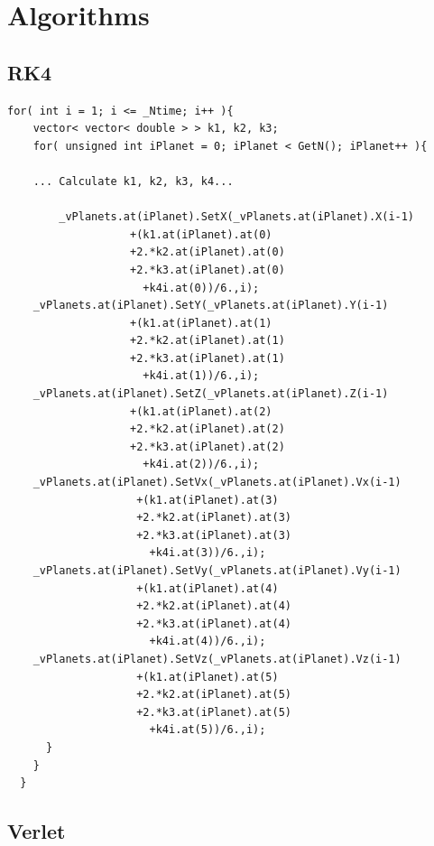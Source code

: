 \documentclass[a4paper,12pt]{report}
\begin{document}
\section{Algorithms}\label{sec:alg}

\subsection{RK4}

\singlespacing
\begin{Verbatim}[fontsize=\small]
   for( int i = 1; i <= _Ntime; i++ ){
    vector< vector< double > > k1, k2, k3; 
    for( unsigned int iPlanet = 0; iPlanet < GetN(); iPlanet++ ){
    
    ... Calculate k1, k2, k3, k4...
    
    	_vPlanets.at(iPlanet).SetX(_vPlanets.at(iPlanet).X(i-1)
				   +(k1.at(iPlanet).at(0)
				   +2.*k2.at(iPlanet).at(0)
				   +2.*k3.at(iPlanet).at(0)
				     +k4i.at(0))/6.,i);
	_vPlanets.at(iPlanet).SetY(_vPlanets.at(iPlanet).Y(i-1)
				   +(k1.at(iPlanet).at(1)
				   +2.*k2.at(iPlanet).at(1)
				   +2.*k3.at(iPlanet).at(1)
				     +k4i.at(1))/6.,i);
	_vPlanets.at(iPlanet).SetZ(_vPlanets.at(iPlanet).Z(i-1)
				   +(k1.at(iPlanet).at(2)
				   +2.*k2.at(iPlanet).at(2)
				   +2.*k3.at(iPlanet).at(2)
				     +k4i.at(2))/6.,i);
	_vPlanets.at(iPlanet).SetVx(_vPlanets.at(iPlanet).Vx(i-1)
				    +(k1.at(iPlanet).at(3)
				    +2.*k2.at(iPlanet).at(3)
				    +2.*k3.at(iPlanet).at(3)
				      +k4i.at(3))/6.,i);
	_vPlanets.at(iPlanet).SetVy(_vPlanets.at(iPlanet).Vy(i-1)
				    +(k1.at(iPlanet).at(4)
				    +2.*k2.at(iPlanet).at(4)
				    +2.*k3.at(iPlanet).at(4)
				      +k4i.at(4))/6.,i);
	_vPlanets.at(iPlanet).SetVz(_vPlanets.at(iPlanet).Vz(i-1)
				    +(k1.at(iPlanet).at(5)
				    +2.*k2.at(iPlanet).at(5)
				    +2.*k3.at(iPlanet).at(5)
				      +k4i.at(5))/6.,i);
      }
    }
  }
\end{Verbatim}
\doublespacing


\subsection{Verlet}
\end{document}

